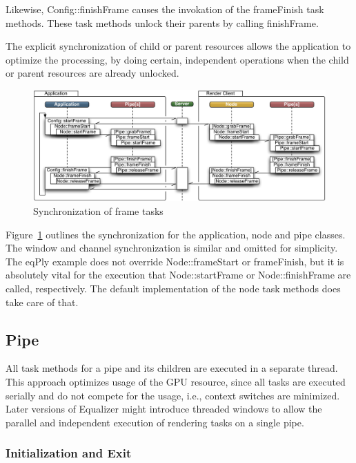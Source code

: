 \documentclass[10pt,a4]{scrartcl}
\newcommand{\fig}[1]{Figure~\ref{#1}}
\begin{document}
Likewise, \textsf{Config::finishFrame} causes the invokation of the
\textsf{frameFinish} task methods. These task methods unlock their
parents by calling \textsf{finishFrame}.

The explicit synchronization of child or parent resources allows the
application to optimize the processing, by doing certain, independent
operations when the child or parent resources are already unlocked.

\begin{figure}[ht!]\center
  \includegraphics[width=.9\textwidth]{images/mainloop.pdf}
  {\caption{\small\label{fFrameSync}Synchronization of frame tasks}}
\end{figure}

\fig{fFrameSync} outlines the synchronization for the application, node
and pipe classes. The window and channel synchronization is similar and
omitted for simplicity. The \textsf{eqPly} example does not override
\textsf{Node::frameStart} or \textsf{frameFinish}, but it is absolutely
vital for the execution that \textsf{Node::startFrame} or
\textsf{Node::finishFrame} are called, respectively. The default
implementation of the node task methods does take care of that.

\subsection{Pipe}

All task methods for a pipe and its children are executed in a separate
thread. This approach optimizes usage of the GPU resource, since all
tasks are executed serially and do not compete for the usage, i.e.,
context switches are minimized. Later versions of Equalizer might
introduce threaded windows to allow the parallel and independent
execution of rendering tasks on a single pipe.

\subsubsection{Initialization and Exit}
\end{document}
